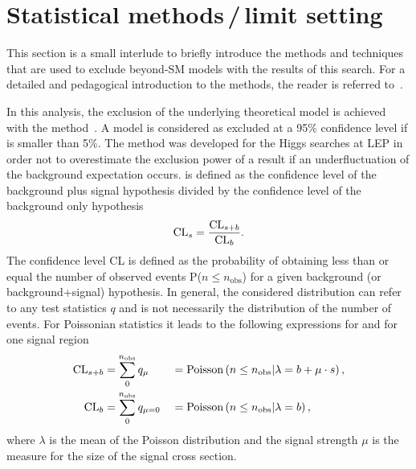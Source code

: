 \section{Statistical methods\,/\,limit setting}
This section is a small interlude to briefly introduce the methods and techniques that are used to exclude beyond-SM models with the results of this search.
For a detailed and pedagogical introduction to the methods, the reader is referred to~\cite{bib:Ott_Thesis}.

In this analysis, the exclusion of the underlying theoretical model is achieved with the \CLs method~\cite{bib:CLS_1999,bib:CLS_2000,bib:CLS_2002}.
A model is considered as excluded at a 95\% confidence level if \CLs is smaller than 5\%.
The \CLs method was developed for the Higgs searches at LEP in order not to overestimate the exclusion power of a result if an  underfluctuation of the background expectation occurs.
\CLs is defined as the confidence level of the background plus signal hypothesis divided by the confidence level of the background only hypothesis
\begin{equation}
\text{CL}_{s} = \frac{\text{CL}_{s+b}}{\text{CL}_{b}}.
\end{equation}
The confidence level CL is defined as the probability of obtaining less than or equal the number of observed events P($n\leq n_{\text{obs}}$) for a given background (or background+signal) hypothesis.
In general, the considered distribution can refer to any test statistics $q$ and is not necessarily the distribution of the number of events.
For Poissonian statistics it leads to the following expressions for \CLsb and \CLb for one signal region
\begin{equation}
\label{eq:CLsb_CLb}
\begin{aligned}
\text{CL}_{s+b} &= \sum\limits_{0}^{n_{\text{obs}}} q_{\mu}    &&= \text{Poisson}\left( n\leq n_{\text{obs}} |\lambda = b+\mu\cdot s   \right),\\
\text{CL}_{b}  &= \sum\limits_{0}^{n_{\text{obs}}} q_{\mu = 0} &&= \text{Poisson}\left( n \leq n_{\text{obs}} |\lambda = b   \right),\
\end{aligned}
\end{equation}
where $\lambda$ is the mean of the Poisson distribution and the signal strength $\mu$ is the measure for the size of the signal cross section.

